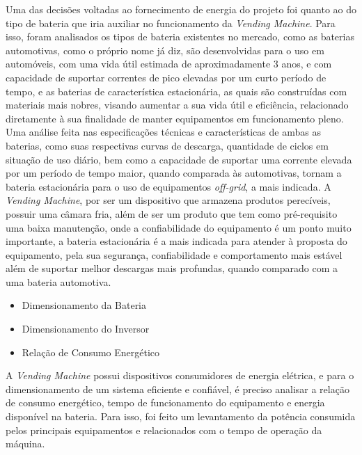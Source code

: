 		Uma das decisões voltadas ao fornecimento de energia do projeto foi quanto ao do tipo de bateria que iria auxiliar no funcionamento da \textit{Vending Machine}. Para isso, foram analisados os tipos de bateria existentes no mercado, como as baterias automotivas, como o próprio nome já diz, são desenvolvidas para o uso em automóveis, com uma vida útil estimada de aproximadamente 3 anos, e com capacidade de suportar correntes de pico elevadas por um curto período de tempo, e as baterias de característica estacionária, as quais são construídas com materiais mais nobres, visando aumentar a sua vida útil e eficiência, relacionado diretamente à sua finalidade de manter equipamentos em funcionamento pleno. 
    	Uma análise feita nas especificações técnicas e características de ambas as baterias, como suas respectivas curvas de descarga, quantidade de ciclos em situação de uso diário, bem como a capacidade de suportar uma corrente elevada por um período de tempo maior, quando comparada às automotivas, tornam a bateria estacionária para o uso de equipamentos\textit{ off-grid}, a mais indicada.
   		A \textit{Vending Machine}, por ser um dispositivo que armazena produtos perecíveis, possuir uma câmara fria, além de ser um produto que tem como pré-requisito uma baixa manutenção, onde a confiabilidade do equipamento é um ponto muito importante, a bateria estacionária é a mais indicada para atender à proposta do equipamento, pela sua segurança, confiabilidade e comportamento mais estável além de suportar melhor descargas mais profundas, quando comparado com a uma bateria automotiva.
        
        \begin{itemize}
\item Dimensionamento da Bateria
\end{itemize}

\begin{itemize}
\item Dimensionamento do Inversor
\end{itemize}
        
\begin{itemize}
\item Relação de Consumo Energético
\end{itemize}
		A \textit{Vending Machine} possui dispositivos consumidores de energia elétrica, e para o dimensionamento de um sistema eficiente e confiável, é preciso analisar a relação de consumo energético, tempo de funcionamento do equipamento e energia disponível na bateria. Para isso, foi feito um levantamento da potência consumida pelos principais equipamentos e relacionados com o tempo de operação da máquina.
        
